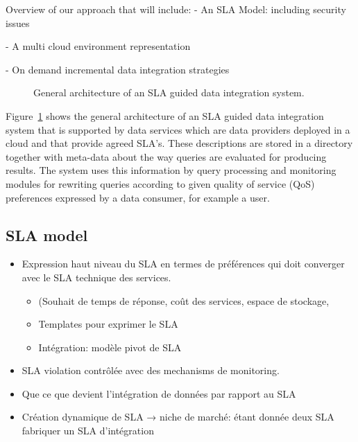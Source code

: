 {\color{green}
Overview of our approach that will include:
- An SLA Model: including security issues

- A multi cloud environment representation

- On demand incremental data integration strategies
}

\begin{figure}
\caption{General architecture of an SLA guided  data integration system.\label{fig:arch}}
\end{figure}

Figure~\ref{fig:arch} shows the general architecture of an SLA guided data integration system that is supported by data services which are data providers deployed in a cloud and that provide agreed SLA’s. 
These descriptions are stored in a directory together with meta-data about the way queries are evaluated for producing results. 
The system uses this information  by query processing and monitoring modules for rewriting queries according to given quality of service (QoS) preferences expressed by a data consumer, for example a user.

\subsection{SLA model}
\label{sec:slaModel}

\begin{itemize}
\item Expression haut niveau du SLA en termes de préférences qui doit converger avec le SLA technique des services.
  \begin{itemize}
  \item (Souhait de temps de réponse, coût des services, espace de stockage,  
  \item Templates pour exprimer le SLA
  \item Intégration: modèle pivot de SLA
\end{itemize}

\item SLA violation contrôlée avec des mechanisms de monitoring.
\item Que ce que devient l’intégration de données par rapport au SLA
\item Création dynamique de SLA → niche de marché: étant donnée deux SLA fabriquer un SLA d’intégration
\end{itemize}


